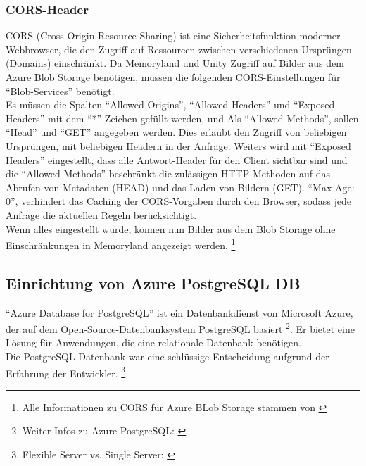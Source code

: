 \subsubsection{CORS-Header}

CORS (Cross-Origin Resource Sharing) ist eine Sicherheitsfunktion moderner Webbrowser, 
die den Zugriff auf Ressourcen zwischen verschiedenen Ursprüngen (Domains) einschränkt.
Da Memoryland und Unity Zugriff auf Bilder aus dem Azure Blob Storage benötigen, müssen
die folgenden CORS-Einstellungen für ``Blob-Services'' benötigt.
\\
Es müssen die Spalten ``Allowed Origins'', ``Allowed Headers'' und ``Exposed Headers''
mit dem ``*'' Zeichen gefüllt werden, und Als ``Allowed Methods'', sollen ``Head'' und
``GET'' angegeben werden. Dies erlaubt den Zugriff von beliebigen Ursprüngen, mit beliebigen
Headern in der Anfrage. Weiters wird mit ``Exposed Headers'' eingestellt, dass alle 
Antwort-Header für den Client sichtbar sind und die ``Allowed Methods'' beschränkt die 
zulässigen HTTP-Methoden auf das Abrufen von Metadaten (HEAD) und das 
Laden von Bildern (GET). ``Max Age: 0'', verhindert das Caching der CORS-Vorgaben 
durch den Browser, sodass jede Anfrage die aktuellen Regeln berücksichtigt.
\\
Wenn alles eingestellt wurde, können nun Bilder aus dem Blob Storage ohne Einschränkungen 
in Memoryland angezeigt werden. \footnote{Alle Informationen zu CORS für Azure BLob Storage stammen von \cite{MicrosoftCorporationc}}


\subsection{Einrichtung von Azure PostgreSQL DB}

``Azure Database for PostgreSQL'' ist ein Datenbankdienst von Microsoft Azure, 
der auf dem Open-Source-Datenbanksystem PostgreSQL basiert \footnote{Weiter Infos zu Azure PostgreSQL: \cite{MicrosoftCorporationf}}. 
Er bietet eine Lösung für Anwendungen, die eine relationale Datenbank benötigen.
\\
Die PostgreSQL Datenbank war eine schlüssige Entscheidung aufgrund der Erfahrung der Entwickler.
\footnote{Flexible Server vs. Single Server: \cite{MicrosoftCorporatione}}

